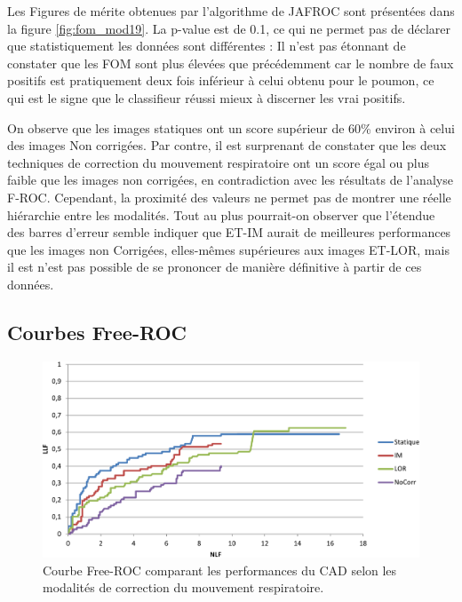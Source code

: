 Les Figures de mérite obtenues par l'algorithme de JAFROC sont présentées dans la figure \ref{fig:fom_mod19}. La p-value est de 0.1, ce qui ne permet pas de déclarer que statistiquement les données sont différentes : 
Il n'est pas étonnant de constater que les FOM sont plus élevées que précédemment car le nombre de faux positifs est pratiquement deux fois inférieur à celui obtenu pour le poumon, ce qui est le signe que le classifieur réussi mieux à discerner les vrai positifs.

On observe que les images statiques ont un score supérieur de 60\% environ à celui des images Non corrigées. Par contre, il est surprenant de constater que les deux techniques de correction du mouvement respiratoire ont un score égal ou plus faible que les images non corrigées, en contradiction avec les résultats de l'analyse F-ROC. Cependant, la proximité des valeurs ne permet pas de montrer une réelle hiérarchie entre les modalités. Tout au plus pourrait-on observer que l'étendue des barres d'erreur semble indiquer que ET-IM aurait de meilleures performances que les images non Corrigées, elles-mêmes supérieures aux images ET-LOR, mais il est n'est pas possible de se prononcer de manière définitive à partir de ces données. 



\subsection{Courbes Free-ROC}

\begin{figure}[h!]
 \begin{center}
   \includegraphics[width=15cm]{images/FROC_mod19}
   \vspace{-0.3cm}
 \end{center}
 \caption{Courbe Free-ROC comparant les performances du CAD selon les modalités de correction du mouvement respiratoire.}
\label{fig:froc_mod19}
\end{figure}


